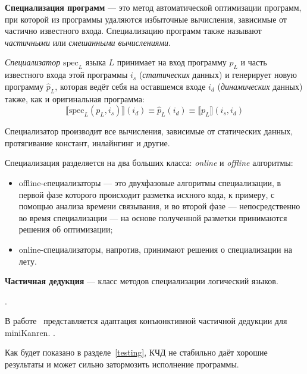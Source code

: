 {\bf Специализация программ} --- это метод автоматической оптимизации программ,
при которой из программы удаляются избыточные вычисления, зависимые от частично известного входа.
Специализацию программ также называют \emph{частичными} или \emph{смешанными вычислениями}\cite{jones}.

{\it Специализатор} $\text{spec}_L$ языка $L$ принимает на вход программу $p_L$ и часть известного входа этой
программы $i_s$ (\emph{статических} данных) и генерирует новую программу $\hat{p}_L$, которая ведёт себя на оставшемся
входе $i_d$ (\emph{динамических} данных) также, как и оригинальная программа:
\[
  \llbracket \text{spec}_L(p_L, i_s) \rrbracket (i_d) \equiv \hat{p}_L (i_d) \equiv \llbracket p_L \rrbracket (i_s, i_d)
\]

Специализатор производит все вычисления, зависимые от статических данных,
протягивание констант, инлайнгинг и другие.


Специализация разделяется на два больших класса: \emph{online} и \emph{offline} алгоритмы:
\begin{itemize}
\item offline-cпециализаторы --- это двухфазовые алгоритмы специализации, в первой фазе
которого происходит разметка исхного кода, к примеру, с помощью анализа времени связывания,
и во второй фазе --- непосредственно во время специализации --- на основе полученной
разметки принимаются решения об оптимизации;

\item online-специализаторы, напротив, принимают решения о специализации на лету.
\end{itemize}





{\bf Частичная дедукция} --- класс методов специализации логический языков.

\cite{advanced}

.

В работе~\cite{lozov} представляется адаптация конъюнктивной частичной дедукции для miniKanren.
.

Как будет показано в разделе~\ref{testing}, КЧД не стабильно даёт хорошие результаты и
может сильно затормозить исполнение программы.
